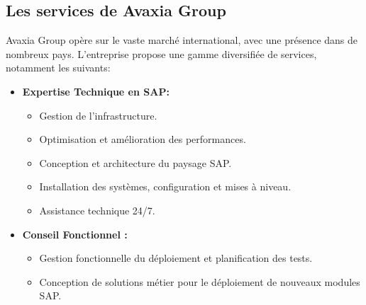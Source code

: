 \subsection{Les services de Avaxia Group}
\par Avaxia Group opère sur le vaste marché international, avec une présence dans de nombreux pays. 
L'entreprise propose une gamme diversifiée de services, notamment les suivants\cite{serAvaxia}:

\begin{itemize}

    \item \textbf{Expertise Technique en SAP: }
    \begin{itemize}
        \item  Gestion de l'infrastructure.
        \item  Optimisation et amélioration des performances.
        \item  Conception et architecture du paysage SAP.
        \item  Installation des systèmes, configuration et mises à niveau.
        \item  Assistance technique 24/7.
    \end{itemize}
    \item \textbf{Conseil Fonctionnel : }
            \begin{itemize}
                \item  Gestion fonctionnelle du déploiement et planification des tests.
                \item  Conception de solutions métier pour le déploiement de nouveaux modules SAP.
        

\end{itemize}
\end{itemize}
